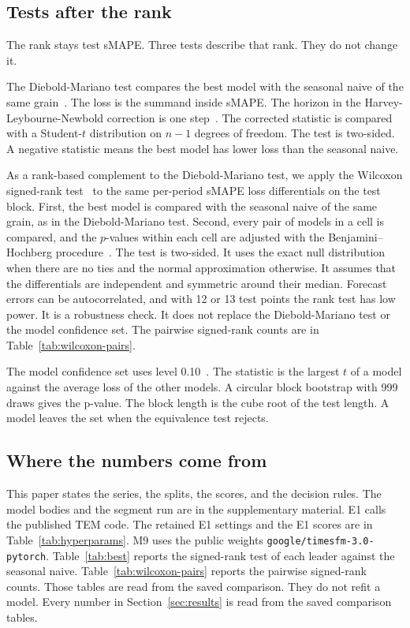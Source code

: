 \subsection{Tests after the rank}
\label{sec:tests}

The rank stays test sMAPE.
Three tests describe that rank.
They do not change it.

The Diebold-Mariano test compares the best model with the seasonal naive of the same grain~\citep{diebold1995comparing}.
The loss is the summand inside sMAPE.
The horizon in the Harvey-Leybourne-Newbold correction is one step~\citep{harvey1997testing}.
The corrected statistic is compared with a Student-$t$ distribution on $n-1$ degrees of freedom.
The test is two-sided.
A negative statistic means the best model has lower loss than the seasonal naive.

As a rank-based complement to the Diebold-Mariano test, we apply the Wilcoxon signed-rank test~\citep{wilcoxon1945individual} to the same per-period sMAPE loss differentials on the test block.
First, the best model is compared with the seasonal naive of the same grain, as in the Diebold-Mariano test.
Second, every pair of models in a cell is compared, and the $p$-values within each cell are adjusted with the Benjamini--Hochberg procedure~\citep{benjamini1995fdr}.
The test is two-sided.
It uses the exact null distribution when there are no ties and the normal approximation otherwise.
It assumes that the differentials are independent and symmetric around their median.
Forecast errors can be autocorrelated, and with 12 or 13 test points the rank test has low power.
It is a robustness check.
It does not replace the Diebold-Mariano test or the model confidence set.
The pairwise signed-rank counts are in Table~\ref{tab:wilcoxon-pairs}.

The model confidence set uses level 0.10~\citep{hansen2011mcs}.
The statistic is the largest $t$ of a model against the average loss of the other models.
A circular block bootstrap with 999 draws gives the p-value.
The block length is the cube root of the test length.
A model leaves the set when the equivalence test rejects.

\subsection{Where the numbers come from}
\label{sec:repro}

This paper states the series, the splits, the scores, and the decision rules.
The model bodies and the segment run are in the supplementary material.
E1 calls the published TEM code.
The retained E1 settings and the E1 scores are in Table~\ref{tab:hyperparams}.
M9 uses the public weights \texttt{google/timesfm-3.0-pytorch}.
Table~\ref{tab:best} reports the signed-rank test of each leader against the seasonal naive.
Table~\ref{tab:wilcoxon-pairs} reports the pairwise signed-rank counts.
Those tables are read from the saved comparison.
They do not refit a model.
Every number in Section~\ref{sec:results} is read from the saved comparison tables.

